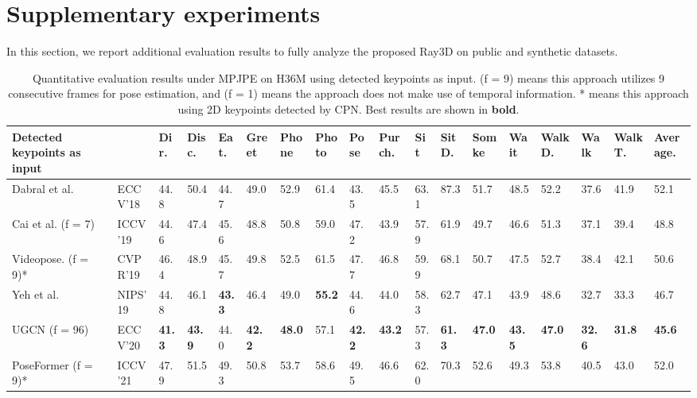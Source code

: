 \documentclass[10pt,twocolumn,letterpaper]{article}
\begin{document}
\section{Supplementary  experiments}
In this section, we report additional  evaluation results to fully analyze the proposed Ray3D on public and synthetic datasets.

\begin{table*}[htbp]
\centering
\tiny
\caption{Quantitative evaluation results under MPJPE on H36M using detected keypoints as input. (f = 9) means this approach utilizes 9 consecutive frames for pose estimation, and (f = 1) means the approach does not make use of temporal information. * means this approach using 2D keypoints detected by CPN. Best results are shown in \textbf{bold}.}
\begin{tabular}{@{}l|llllllllllllllll|l@{}}
\toprule
Detected keypoints as input     &                 & Dir.   & Disc. & Eat.  & Greet & Phone & Photo & Pose  & Purch. & Sit   & SitD. & Somke & Wait  & WalkD.& Walk  & WalkT. & Average.        \\ \midrule
Dabral et al. \cite{dabral2018learning}           &ECCV'18 & 44.8  & 50.4  & 44.7  & 49.0  & 52.9  & 61.4  & 43.5   & 45.5  & 63.1  & 87.3  & 51.7  & 48.5  & 52.2  & 37.6   & 41.9   & 52.1   \\
Cai et al. (f = 7) \cite{cai2019exploiting}       &ICCV'19 & 44.6  & 47.4  & 45.6  & 48.8  & 50.8  & 59.0  & 47.2   & 43.9  & 57.9  & 61.9  & 49.7  & 46.6  & 51.3  & 37.1   & 39.4   & 48.8   \\
Videopose. (f = 9)* \cite{dario2019videopose}     &CVPR'19 & 46.4  & 48.9  & 45.7  & 49.8  & 52.5  & 61.5  & 47.7   & 46.8  & 59.9  & 68.1  & 50.7  & 47.5  & 52.7  & 38.4   & 42.1   & 50.6   \\
Yeh et al.\cite{yeh2019chirality}                 &NIPS'19 & 44.8  & 46.1  & \textbf{43.3}   & 46.4  & 49.0  & \textbf{55.2}   & 44.6   & 44.0  & 58.3  & 62.7  & 47.1  & 43.9  & 48.6  & 32.7   & 33.3   & 46.7   \\
UGCN  (f = 96) \cite{wang2020motion}              &ECCV’20 & \textbf{41.3}  & \textbf{43.9}   & 44.0  & \textbf{42.2}   & \textbf{48.0}   & 57.1  & \textbf{42.2}    & \textbf{43.2}   & 57.3  &\textbf{61.3}   & \textbf{47.0}   & \textbf{43.5}   & \textbf{47.0}   & \textbf{32.6}    & \textbf{31.8}   & \textbf{45.6}   \\
PoseFormer (f = 9)* \cite{ce2021poseformer}       &ICCV'21 & 47.9  & 51.5  & 49.3  & 50.8  & 53.7  & 58.6  & 49.5   & 46.6  & 62.0  & 70.3  & 52.6  & 49.3  & 53.8  & 40.5   & 43.0   & 52.0   \\

\end{tabular}
\end{table*}
\end{document}
